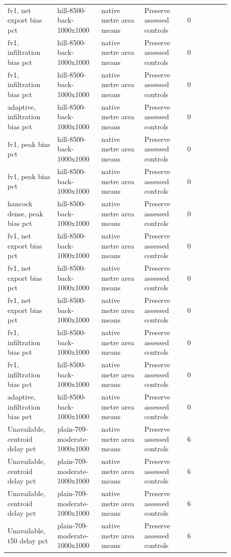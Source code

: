 \begin{longtable}{p{0.1760\linewidth}p{0.1760\linewidth}p{0.1760\linewidth}p{0.1760\linewidth}p{0.1760\linewidth}}
fv1, net export bias pct & hill-8500-back-1000x1000 & native metre area means & Preserve assessed controls & 0 \\
fv1, infiltration bias pct & hill-8500-back-1000x1000 & native metre area means & Preserve assessed controls & 0 \\
fv1, infiltration bias pct & hill-8500-back-1000x1000 & native metre area means & Preserve assessed controls & 0 \\
adaptive, infiltration bias pct & hill-8500-back-1000x1000 & native metre area means & Preserve assessed controls & 0 \\
fv1, peak bias pct & hill-8500-back-1000x1000 & native metre area means & Preserve assessed controls & 0 \\
fv1, peak bias pct & hill-8500-back-1000x1000 & native metre area means & Preserve assessed controls & 0 \\
hancock dense, peak bias pct & hill-8500-back-1000x1000 & native metre area means & Preserve assessed controls & 0 \\
fv1, net export bias pct & hill-8500-back-1000x1000 & native metre area means & Preserve assessed controls & 0 \\
fv1, net export bias pct & hill-8500-back-1000x1000 & native metre area means & Preserve assessed controls & 0 \\
fv1, net export bias pct & hill-8500-back-1000x1000 & native metre area means & Preserve assessed controls & 0 \\
fv1, infiltration bias pct & hill-8500-back-1000x1000 & native metre area means & Preserve assessed controls & 0 \\
fv1, infiltration bias pct & hill-8500-back-1000x1000 & native metre area means & Preserve assessed controls & 0 \\
adaptive, infiltration bias pct & hill-8500-back-1000x1000 & native metre area means & Preserve assessed controls & 0 \\
Unavailable, centroid delay pct & plain-709-moderate-1000x1000 & native metre area means & Preserve assessed controls & 6 \\
Unavailable, centroid delay pct & plain-709-moderate-1000x1000 & native metre area means & Preserve assessed controls & 6 \\
Unavailable, centroid delay pct & plain-709-moderate-1000x1000 & native metre area means & Preserve assessed controls & 6 \\
Unavailable, t50 delay pct & plain-709-moderate-1000x1000 & native metre area means & Preserve assessed controls & 6 \\

\end{longtable}
